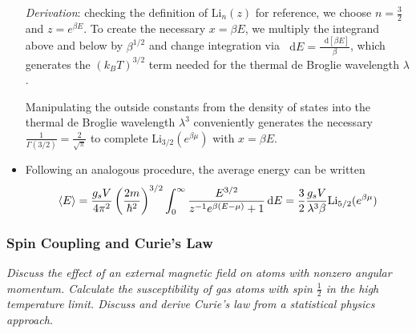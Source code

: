 \documentclass[11pt, a4paper]{article}
\newcommand{\diff}{\mathop{}\!\mathrm{d}} %
\begin{document}
\begin{itemize}
	\textit{Derivation}: checking the definition of $ \mathrm{Li}_{n}(z) $ for reference, we choose $ n = \frac{3}{2} $ and $ z = e^{\beta E} $. To create the necessary $ x = \beta E $, we multiply the integrand above and below by $ \beta^{1/2} $ and change integration via $ \diff E =  \frac{\diff[\beta E]}{\beta}  $, which generates the $ (k_{B}T)^{3/2} $ term needed for the thermal de Broglie wavelength $ \lambda $.
	
	Manipulating the outside constants from the density of states into the thermal de Broglie wavelength $ \lambda^{3} $ conveniently generates the necessary $ \frac{1}{\Gamma(3/2)} = \frac{2}{\sqrt{\pi}} $ to complete $ \mathrm{Li}_{3/2}(e^{\beta \mu}) $ with $ x = \beta E $.
	
	\item Following an analogous procedure, the average energy can be written
	\begin{equation*}
		\expval{E} = \frac{g_{s}V}{4\pi^{2}} \left(\frac{2m}{\hbar^{2}}\right)^{3/2} \int_{0}^{\infty}\frac{E^{3/2}}{z^{-1}e^{\beta (E - \mu)} + 1} \diff E = \frac{3}{2}\frac{g_{s}V}{\lambda^{3}\beta}\mathrm{Li}_{5/2}(e^{\beta \mu})
	\end{equation*}
		

\end{itemize}

\subsubsection{Spin Coupling and Curie's Law}
\textit{Discuss the effect of an external magnetic field on atoms with nonzero angular momentum. Calculate the susceptibility of gas atoms with spin $ \frac{1}{2} $ in the high temperature limit. Discuss and derive Curie's law from a statistical physics approach.}
\end{document}
